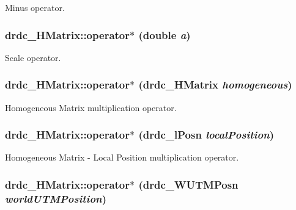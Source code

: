 Minus operator. 

\hypertarget{classdrdc__HMatrix_9125f22fe1c846f0fe33d3bd2782f1e6}{
\subsubsection[operator$\ast$]{ drdc\_\-HMatrix::operator$\ast$ (double {\em a})}}
\label{classdrdc__HMatrix_9125f22fe1c846f0fe33d3bd2782f1e6}


Scale operator. 

\hypertarget{classdrdc__HMatrix_fa022b048b7270e7e09c8e8d25e172f5}{
\subsubsection[operator$\ast$]{ drdc\_\-HMatrix::operator$\ast$ ({\bf drdc\_\-HMatrix} {\em homogeneous})}}
\label{classdrdc__HMatrix_fa022b048b7270e7e09c8e8d25e172f5}


Homogeneous Matrix multiplication operator. 

\hypertarget{classdrdc__HMatrix_6aa7d1bd902154022b03a8b15ee7afa6}{
\subsubsection[operator$\ast$]{ drdc\_\-HMatrix::operator$\ast$ ({\bf drdc\_\-lPosn} {\em localPosition})}}
\label{classdrdc__HMatrix_6aa7d1bd902154022b03a8b15ee7afa6}


Homogeneous Matrix - Local Position multiplication operator. 

\hypertarget{classdrdc__HMatrix_c949f0bedceffa08288465649ee14dfa}{
\subsubsection[operator$\ast$]{ drdc\_\-HMatrix::operator$\ast$ ({\bf drdc\_\-WUTMPosn} {\em worldUTMPosition})}}
\label{classdrdc__HMatrix_c949f0bedceffa08288465649ee14dfa}


